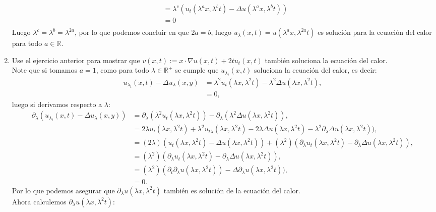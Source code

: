 \begin{homeworkProblem}
\begin{solucion}
\begin{enumerate}
\begin{align*}
          &=\lambda^c(u_{t}(\lambda^ax,\lambda^bt)-\Delta u(\lambda^ax,\lambda^bt))\\
          &=0\\
        \end{align*}
        Luego $\lambda^c=\lambda^b=\lambda^{2a}$, por lo que podemos concluir en que $2a=b$, luego $u_{\lambda}(x,t)=u(\lambda^{a}x,\lambda^{2a}t)$ es solución para la ecuación del calor para todo $a\in \mathbb{R}$.
        \demostrado
      \item Use el ejercicio anterior para mostrar que $v(x,t):=x\cdot \nabla u(x,t)+2tu_t(x,t)$ también soluciona la ecuación del calor.\\
        Note que si tomamos $a=1$, como para todo $\lambda\in\mathbb{R}^{+}$ se cumple que $u_{\lambda_{t}}(x,t)$ soluciona la ecuación del calor, es decir:
        \begin{align*}
          u_{\lambda_{t}}(x,t)-\Delta u_{\lambda}(x,y)&=\lambda^2u_t(\lambda x,\lambda^2t)-\lambda^2\Delta u(\lambda x,\lambda^2 t),\\
          &=0,
        \end{align*}
        luego si derivamos respecto a $\lambda$:
        \begin{align*}
          \partial_{\lambda}(u_{\lambda_{t}}(x,t)-\Delta u_{\lambda}(x,y))&=\partial_{\lambda}(\lambda^2u_t(\lambda x,\lambda^2t))-\partial_{\lambda}(\lambda^2\Delta u(\lambda x,\lambda^2 t)),\\
          &=2\lambda u_t(\lambda x,\lambda^2 t)+\lambda^2u_{t\lambda}(\lambda x,\lambda^2 t)-2\lambda\Delta u(\lambda x,\lambda^2 t)-\lambda^2\partial_{\lambda}\Delta u(\lambda x,\lambda^2 t)),\\
          &=(2\lambda)(u_t(\lambda x,\lambda^2 t)-\Delta u(\lambda x,\lambda^2 t))+(\lambda^2)(\partial_{\lambda}u_t(\lambda x,\lambda^2 t)-\partial_{\lambda}\Delta u(\lambda x,\lambda^2 t)),\\
          &=(\lambda^2)(\partial_{\lambda}u_t(\lambda x,\lambda^2 t)-\partial_{\lambda}\Delta u(\lambda x,\lambda^2 t)),\\
          &=(\lambda^2)(\partial_{t}\partial_{\lambda}u(\lambda x,\lambda^2 t))-\Delta \partial_{\lambda}u(\lambda x,\lambda^2 t)),\\
          &=0.
        \end{align*}
        Por lo que podemos asegurar que $\partial_{\lambda}u(\lambda x,\lambda^2 t)$ también es solución de la ecuación del calor.\\
        Ahora calculemos $\partial_{\lambda}u(\lambda x,\lambda^2 t)$:

\end{enumerate}
\end{solucion}
\end{homeworkProblem}
